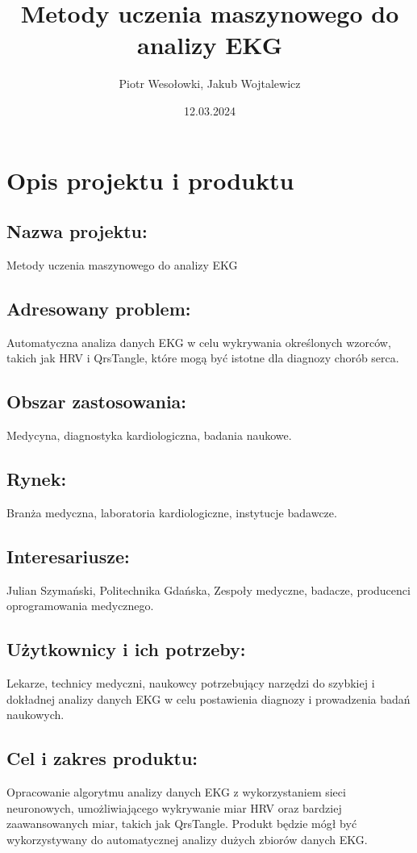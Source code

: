 \documentclass[12pt]{article}
\title{Metody uczenia maszynowego do analizy EKG}
\author{Piotr Wesołowki, Jakub Wojtalewicz}
\date{12.03.2024}
\begin{document}
    \maketitle

    \section{Opis projektu i produktu}

        \subsection*{Nazwa projektu:} 
            Metody uczenia maszynowego do analizy EKG

        \subsection*{Adresowany problem:}
            Automatyczna analiza danych EKG w celu wykrywania określonych wzorców, takich jak HRV i QrsTangle, które mogą być istotne dla diagnozy chorób serca.

        \subsection*{Obszar zastosowania:}
            Medycyna, diagnostyka kardiologiczna, badania naukowe.

        \subsection*{Rynek:}
            Branża medyczna, laboratoria kardiologiczne, instytucje badawcze.

        \subsection*{Interesariusze:}
            Julian Szymański, Politechnika Gdańska, Zespoły medyczne, badacze, producenci oprogramowania medycznego.

        \subsection*{Użytkownicy i ich potrzeby:}
            Lekarze, technicy medyczni, naukowcy potrzebujący narzędzi do szybkiej i dokładnej analizy danych EKG w celu postawienia diagnozy i prowadzenia badań naukowych.

        \subsection*{Cel i zakres produktu:}  
            Opracowanie algorytmu analizy danych EKG z wykorzystaniem sieci neuronowych, umożliwiającego wykrywanie miar HRV oraz bardziej zaawansowanych miar, takich jak QrsTangle. Produkt będzie mógł być wykorzystywany do automatycznej analizy dużych zbiorów danych EKG.  
\end{document}
